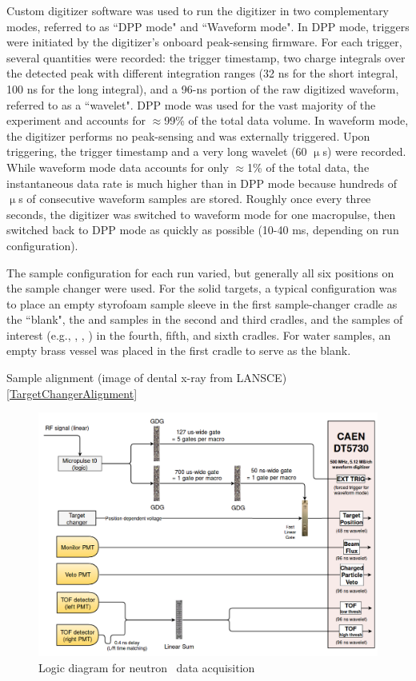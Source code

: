 Custom digitizer software was used to run the 
digitizer in two complementary modes, referred to as ``DPP mode" and ``Waveform 
mode". In DPP mode, triggers were initiated by the digitizer's onboard
peak-sensing firmware. For each trigger, several quantities were recorded: the trigger 
timestamp, two charge integrals over the detected peak with different
integration ranges (32 ns for the short integral, 100 ns for the long integral),
and a 96-ns portion of the raw digitized waveform, referred to as a ``wavelet".
DPP mode was used for the vast majority of the 
experiment and accounts for $\approx$99\% of the total data volume. In waveform mode, 
the digitizer performs no peak-sensing and was externally triggered. Upon 
triggering, the trigger timestamp and a very long wavelet (60 $\upmu$s) 
were recorded. While waveform mode data accounts for only $\approx$1\% of the total data, 
the instantaneous data rate is much higher than in DPP 
mode because hundreds of $\upmu$s of consecutive waveform samples are 
stored. Roughly once every three seconds, the digitizer was switched to 
waveform mode for one macropulse, then switched back to DPP mode as quickly as
possible (10-40 ms, depending on run configuration).  

The sample configuration for each run varied, but generally all six positions on
the sample changer were used. For the solid targets, a typical configuration was
to place an empty styrofoam sample sleeve in the first sample-changer cradle as
the ``blank", the \cNat and \pbNat samples in the second and third
cradles, and the samples of interest (e.g., \niEight, \niNat, \niFour) in
the fourth, fifth, and sixth cradles. For water samples, an empty brass vessel
was placed in the first cradle to serve as the blank.

Sample alignment (image of dental x-ray from LANSCE) \ref{TargetChangerAlignment}

\begin{figure}
    \includegraphics[scale=0.6]{figures/TCSLogicDiagram.png}
    \caption{Logic diagram for neutron \tot\ data acquisition}
    \label{TCSLogicDiagram}
\end{figure}

\afterpage{\clearpage}
